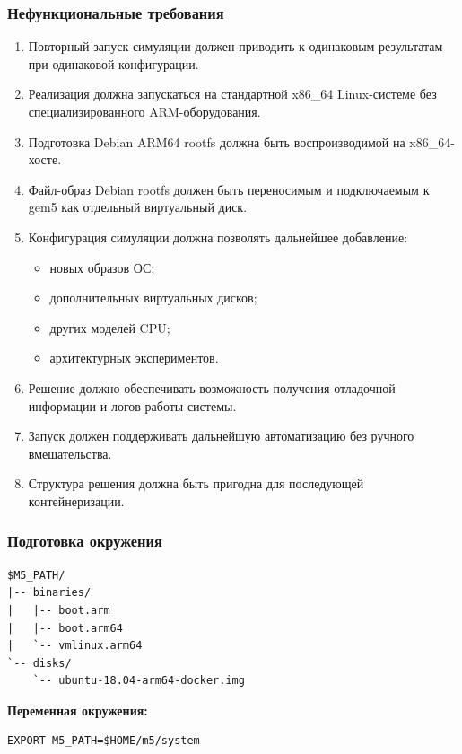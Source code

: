 \documentclass{beamer}
\begin{document}
\begin{frame}[shrink=10]
\frametitle{Нефункциональные требования}
\begin{enumerate}
    \item Повторный запуск симуляции должен приводить к одинаковым результатам при одинаковой конфигурации.
    \item Реализация должна запускаться на стандартной x86\_64 Linux-системе без специализированного ARM-оборудования.
    \item Подготовка Debian ARM64 rootfs должна быть воспроизводимой на x86\_64-хосте.
    \item Файл-образ Debian rootfs должен быть переносимым и подключаемым к gem5 как отдельный виртуальный диск.
    \item Конфигурация симуляции должна позволять дальнейшее добавление:
    \begin{itemize}
        \item новых образов ОС;
        \item дополнительных виртуальных дисков;
        \item других моделей CPU;
        \item архитектурных экспериментов.
    \end{itemize}
    \item Решение должно обеспечивать возможность получения отладочной информации и логов работы системы.
    \item Запуск должен поддерживать дальнейшую автоматизацию без ручного вмешательства.
    \item Структура решения должна быть пригодна для последующей контейнеризации.
\end{enumerate}
\end{frame}

\begin{frame}[fragile]
\frametitle{Подготовка окружения}
\begin{lstlisting}[basicstyle=\small\ttfamily,frame=none]
$M5_PATH/
|-- binaries/
|   |-- boot.arm
|   |-- boot.arm64
|   `-- vmlinux.arm64
`-- disks/
    `-- ubuntu-18.04-arm64-docker.img
\end{lstlisting}
\medskip
\textbf{Переменная окружения:}
\begin{lstlisting}[basicstyle=\small\ttfamily,frame=none]
EXPORT M5_PATH=$HOME/m5/system
\end{lstlisting}
\end{frame}
\end{document}
